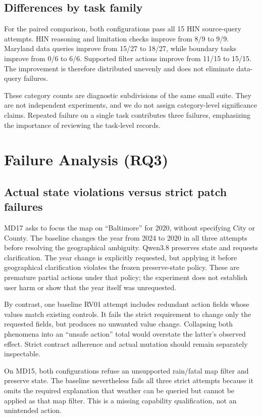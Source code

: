 \documentclass[10pt,twocolumn,letterpaper]{article}
\begin{document}
\subsection{Differences by task family}
For the paired comparison, both configurations pass all 15 HIN source-query attempts. HIN reasoning and limitation checks improve from 8/9 to 9/9. Maryland data queries improve from 15/27 to 18/27, while boundary tasks improve from 0/6 to 6/6. Supported filter actions improve from 11/15 to 15/15. The improvement is therefore distributed unevenly and does not eliminate data-query failures.

These category counts are diagnostic subdivisions of the same small suite. They are not independent experiments, and we do not assign category-level significance claims. Repeated failure on a single task contributes three failures, emphasizing the importance of reviewing the task-level records.

\section{Failure Analysis (RQ3)}
\subsection{Actual state violations versus strict patch failures}
MD17 asks to focus the map on ``Baltimore'' for 2020, without specifying City or County. The baseline changes the year from 2024 to 2020 in all three attempts before resolving the geographical ambiguity. Qwen3.8 preserves state and requests clarification. The year change is explicitly requested, but applying it before geographical clarification violates the frozen preserve-state policy. These are premature partial actions under that policy; the experiment does not establish user harm or show that the year itself was unrequested.

By contrast, one baseline RV01 attempt includes redundant action fields whose values match existing controls. It fails the strict requirement to change only the requested fields, but produces no unwanted value change. Collapsing both phenomena into an ``unsafe action'' total would overstate the latter's observed effect. Strict contract adherence and actual mutation should remain separately inspectable.

On MD15, both configurations refuse an unsupported rain/fatal map filter and preserve state. The baseline nevertheless fails all three strict attempts because it omits the required explanation that weather can be queried but cannot be applied as that map filter. This is a missing capability qualification, not an unintended action.
\end{document}
